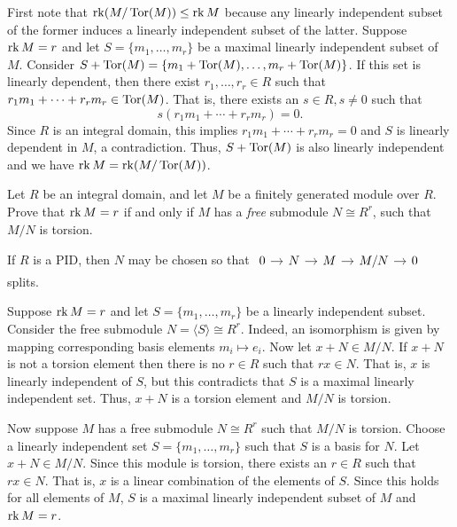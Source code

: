 \documentclass[../../master.tex]{subfiles}
\begin{document}
\begin{solution}
    First note that $\operatorname{rk} (M / \operatorname{Tor}(M)) \leq \operatorname{rk} M$ because any linearly independent subset of the former induces a linearly independent subset of the latter.
    Suppose $\operatorname{rk} M = r$ and let $S = \{m_1, \ldots, m_r\}$ be a maximal linearly independent subset of $M$.
    Consider $S + \operatorname{Tor}(M) = \{m_1 + \operatorname{Tor}(M), \ldots, m_r + \operatorname{Tor}(M)\}$.
    If this set is linearly dependent, then there exist $r_1, \ldots, r_r \in R$ such that $r_1 m_1 + \cdots + r_r m_r \in \operatorname{Tor}(M)$.
    That is, there exists an $s \in R, s \neq 0$ such that
    \[
        s(r_1m_1 + \cdots + r_r m_r) = 0.
    \]
    Since $R$ is an integral domain, this implies $r_1 m_1 + \cdots + r_r m_r = 0$ and $S$ is linearly dependent in $M$, a contradiction.
    Thus, $S + \operatorname{Tor}(M)$ is also linearly independent and we have $\operatorname{rk} M = \operatorname{rk} (M / \operatorname{Tor}(M))$.
\end{solution}

\begin{problem}
    Let $R$ be an integral domain, and let $M$ be a finitely generated module over $R$.
    Prove that $\operatorname{rk} M = r$ if and only if $M$ has a \textit{free} submodule $N \cong R^{r}$, such that $M/N$ is torsion.

    If $R$ is a PID, then $N$ may be chosen so that $
    \begin{tikzcd}[column sep = 1em] 
        0 & N & M & M/N & 0
        \arrow[from=1-1, to=1-2] 
        \arrow[from=1-2, to=1-3] 
        \arrow[from=1-3, to=1-4] 
        \arrow[from=1-4, to=1-5] 
    \end{tikzcd}$
    splits.
\end{problem}

\begin{solution}
    Suppose $\operatorname{rk} M = r$ and let $S = \{m_1, \ldots, m_r\}$ be a linearly independent subset.
    Consider the free submodule $N = \langle S \rangle \cong R^{r}$.
    Indeed, an isomorphism is given by mapping corresponding basis elements $m_i \mapsto e_i$.
    Now let $x + N \in M / N$.
    If $x + N$ is not a torsion element then there is no $r \in R$ such that $rx \in N$.
    That is, $x$ is linearly independent of $S$, but this contradicts that $S$ is a maximal linearly independent set.
    Thus, $x + N$ is a torsion element and $M / N$ is torsion.

    Now suppose $M$ has a free submodule $N \cong R^{r}$ such that $M / N$ is torsion.
    Choose a linearly independent set $S = \{m_1, \ldots, m_r\}$ such that $S$ is a basis for $N$.
    Let $x + N \in M/N$.
    Since this module is torsion, there exists an $r \in R$ such that $rx \in N$.
    That is, $x$ is a linear combination of the elements of $S$.
    Since this holds for all elements of $M$, $S$ is a maximal linearly independent subset of $M$ and $\operatorname{rk} M = r$.
\end{solution}
\end{document}
